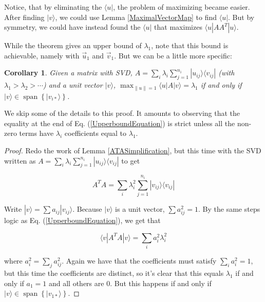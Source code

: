 \documentclass{amsbook}
\newtheorem{corollary}[theorem]{Corollary}
\begin{document}
Notice, that by eliminating the $\langle u|$, the problem of maximizing became easier.  After finding $|v\rangle$, we could use Lemma \ref{MaximalVectorMap} to find $\langle u|$.  But by symmetry, we could have instead found the $\langle u|$ that maximizes $\langle u|AA^T|u\rangle$.

While the theorem gives an upper bound of $\lambda_1$, note that this bound is achievable, namely with $\vec u_1$ and $\vec v_1$.  But we can be a little more specific:

\begin{corollary}
\label{MaximalSpan}
Given a matrix with SVD, $A=\sum_i\lambda_i\sum_{j=1}^{n_i}|u_{ij}\rangle\langle v_{ij}|$ (with $\lambda_1>\lambda_2>\cdots$) and a unit vector $|v\rangle$, $\max_{\|u\|=1}\langle u|A|v\rangle=\lambda_1$ if and only if $|v\rangle\in\operatorname{span}\left\{|v_{i*}\rangle\right\}$.
\end{corollary}

We skip some of the details to this proof.  It amounts to observing that the equality at the end of Eq. (\ref{UpperboundEquation}) is strict unless all the non-zero terms have $\lambda_i$ coefficients equal to $\lambda_1$.

\begin{proof}
Redo the work of Lemma \ref{ATASimplification}, but this time with the SVD written as $A=\sum_i\lambda_i\sum_{j=1}^{n_i}|u_{ij}\rangle\langle v_{ij}|$ to get

$$
A^TA=\sum_i\lambda_i^2\sum_{j=1}^{n_i}|v_{ij}\rangle\langle v_{ij}|
$$

Write $|v\rangle=\sum a_{ij}|v_{ij}\rangle$.  Because $|v\rangle$ is a unit vector, $\sum a_{ij}^2=1$.  By the same steps logic as Eq. (\ref{UpperboundEquation}), we get that

$$
\langle v|A^TA|v\rangle = \sum_ia_i^2\lambda_i^2
$$

where $a_i^2=\sum_ja_{ij}^2$.  Again we have that the coefficients must satisfy $\sum_ia_i^2=1$, but this time the coefficients are distinct, so it's clear that this equals $\lambda_1$ if and only if $a_1=1$ and all others are $0$.  But this happens if and only if $|v\rangle\in\operatorname{span}\left\{|v_{1*}\rangle\right\}$.

\end{proof}
\end{document}
